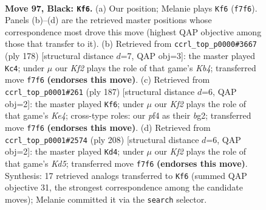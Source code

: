 \documentclass[11pt]{article}
\begin{document}
\clearpage

\begin{figure}[p]\centering
\begin{subfigure}{0.46\textwidth}\centering
\resizebox{\linewidth}{!}{%
\newchessgame
\chessboard[
  setfen={8/5k1K/8/5p2/5P2/3b4/8/8 b - - 9 97},
  showmover=false,
  pgfstyle=straightmove, color=movearrow, markmove={f7-f6}
]}
\caption{}
\end{subfigure}\hfill
\begin{subfigure}{0.46\textwidth}\centering
\resizebox{\linewidth}{!}{%
\newchessgame
\chessboard[
  setfen={8/8/k1n5/8/1K6/7p/7P/6B1 w - - 10 90},
  showmover=false,
  pgfstyle=straightmove, color=movearrow, markmove={b4-c4}
]}
\caption{}
\end{subfigure}
\\[4pt]
\begin{subfigure}{0.46\textwidth}\centering
\resizebox{\linewidth}{!}{%
\newchessgame
\chessboard[
  setfen={8/4b3/8/2p1k3/8/3K2p1/6B1/8 b - - 59 94},
  showmover=false,
  pgfstyle=straightmove, color=movearrow, markmove={e5-f6}
]}
\caption{}
\end{subfigure}\hfill
\begin{subfigure}{0.46\textwidth}\centering
\resizebox{\linewidth}{!}{%
\newchessgame
\chessboard[
  setfen={8/6Bp/7P/3K1k2/8/r7/8/8 w - - 69 105},
  showmover=false,
  pgfstyle=straightmove, color=movearrow, markmove={d5-d4}
]}
\caption{}
\end{subfigure}
\caption{\textbf{Move 97, Black: \texttt{Kf6}.} (a) Our position; Melanie plays \texttt{Kf6} (\texttt{f7f6}). Panels (b)--(d) are the retrieved master positions whose correspondence most drove this move (highest QAP objective among those that transfer to it). (b) Retrieved from \texttt{ccrl\_top\_p0000\#3667} (ply 178) [structural distance $d$=7, QAP obj=3]: the master played \texttt{Kc4}; under $\mu$ our \emph{Kf2} plays the role of that game's \emph{Kb4}; transferred move \texttt{f7f6} \textbf{(endorses this move)}. (c) Retrieved from \texttt{ccrl\_top\_p0001\#261} (ply 187) [structural distance $d$=6, QAP obj=2]: the master played \texttt{Kf6}; under $\mu$ our \emph{Kf2} plays the role of that game's \emph{Ke4}; cross-type roles: our \emph{p}f4 as their \emph{b}g2; transferred move \texttt{f7f6} \textbf{(endorses this move)}. (d) Retrieved from \texttt{ccrl\_top\_p0001\#2574} (ply 208) [structural distance $d$=6, QAP obj=2]: the master played \texttt{Kd4}; under $\mu$ our \emph{Kf2} plays the role of that game's \emph{Kd5}; transferred move \texttt{f7f6} \textbf{(endorses this move)}. Synthesis: 17 retrieved analogs transferred to \texttt{Kf6} (summed QAP objective 31, the strongest correspondence among the candidate moves); Melanie committed it via the \texttt{search} selector.}
\label{fig:thought-m193}
\end{figure}
\end{document}
